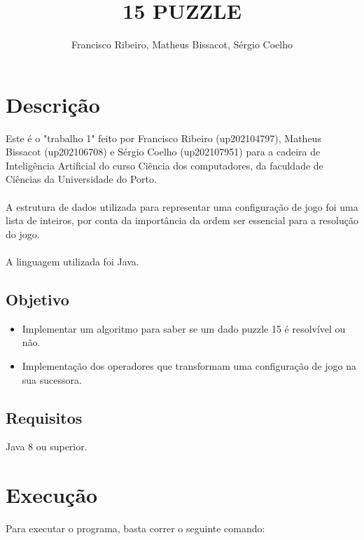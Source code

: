 \documentclass[12pt]{article}
\begin{document}
\title{15 PUZZLE}
\author{Francisco Ribeiro, Matheus Bissacot, Sérgio Coelho}
\date{}

\maketitle

\section{Descrição}

Este é o "trabalho 1" feito por Francisco Ribeiro (up202104797), Matheus Bissacot (up202106708) e Sérgio Coelho (up202107951) para a cadeira de Inteligência Artificial do curso Ciência dos computadores, da faculdade de Ciências da Universidade do Porto.
\paragraph{}
A estrutura de dados utilizada para representar uma configuração de jogo foi uma lista de inteiros, por conta da importância da ordem ser essencial para a resolução do jogo.
\paragraph{}
A linguagem utilizada foi Java.

\subsection{Objetivo}

\begin{itemize}
\item Implementar um algoritmo para saber se um dado puzzle 15 é resolvível ou não.
\item Implementação dos operadores que transformam uma configuração de jogo na sua sucessora.
\end{itemize}

\subsection{Requisitos}

Java 8 ou superior.

\section{Execução}

Para executar o programa, basta correr o seguinte comando:
\end{document}
